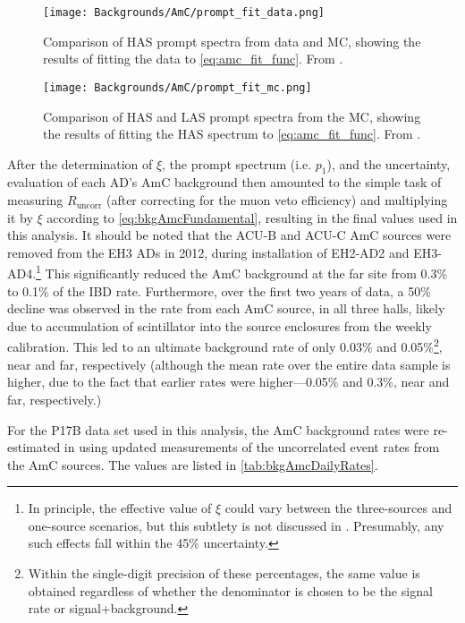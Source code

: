 \documentclass[../thesis.tex]{subfiles}
\begin{document}
\begin{figure}[ht]
  \texttt{[image: Backgrounds/AmC/prompt\_fit\_data.png]}
  \caption{Comparison of HAS prompt spectra from data and MC, showing the results of fitting the data to \autoref{eq:amc_fit_func}. From \cite{Gu_2016}.}
  \label{fig:amc_prompt_fit_data}
\end{figure}

\begin{figure}[ht]
  \texttt{[image: Backgrounds/AmC/prompt\_fit\_mc.png]}
  \caption{Comparison of HAS and LAS prompt spectra from the MC, showing the results of fitting the HAS spectrum to \autoref{eq:amc_fit_func}. From \cite{Gu_2016}.}
  \label{fig:amc_prompt_fit_mc}
\end{figure}

After the determination of $\xi$, the prompt spectrum (i.e. $p_1$), and the uncertainty, evaluation of each AD's AmC background then amounted to the simple task of measuring $R_{\mathrm{uncorr}}$ (after correcting for the muon veto efficiency) and multiplying it by $\xi$ according to \autoref{eq:bkgAmcFundamental}, resulting in the final values used in this analysis. It should be noted that the ACU-B and ACU-C AmC sources were removed from the EH3 ADs in 2012, during installation of EH2-AD2 and EH3-AD4.\footnote{In principle, the effective value of $\xi$ could vary between the three-sources and one-source scenarios, but this subtlety is not discussed in \cite{Gu_2016}. Presumably, any such effects fall within the 45\% uncertainty.} This significantly reduced the AmC background at the far site from 0.3\% to 0.1\% of the IBD rate. Furthermore, over the first two years of data, a 50\% decline was observed in the rate from each AmC source, in all three halls, likely due to accumulation of scintillator into the source enclosures from the weekly calibration. This led to an ultimate background rate of only 0.03\% and 0.05\%\footnote{Within the single-digit precision of these percentages, the same value is obtained regardless of whether the denominator is chosen to be the signal rate or signal+background.}, near and far, respectively (although the mean rate over the entire data sample is higher, due to the fact that earlier rates were higher---0.05\% and 0.3\%, near and far, respectively.)

For the P17B data set used in this analysis, the AmC background rates were re-estimated in \cite{lianghongBkg} using updated measurements of the uncorrelated event rates from the AmC sources. The values are listed in \autoref{tab:bkgAmcDailyRates}.
\end{document}
